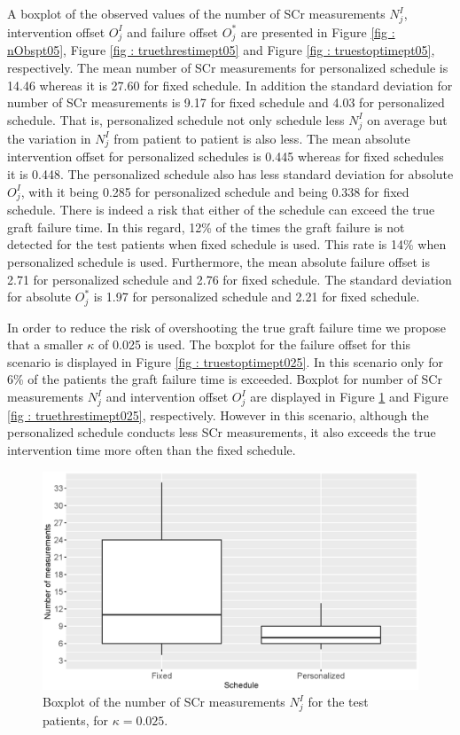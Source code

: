 A boxplot of the observed values of the number of SCr measurements $N^I_j$, intervention offset $O^I_j$ and failure offset $O^*_j$ are presented in Figure \ref{fig : nObspt05}, Figure \ref{fig : truethrestimept05} and Figure \ref{fig : truestoptimept05}, respectively. The mean number of SCr measurements for personalized schedule is 14.46 whereas it is 27.60 for fixed schedule. In addition the standard deviation for number of SCr measurements is 9.17 for fixed schedule and 4.03 for personalized schedule. That is, personalized schedule not only schedule less $N^I_j$ on average but the variation in $N^I_j$ from patient to patient is also less. The mean absolute intervention offset for personalized schedules is 0.445 whereas for fixed schedules it is 0.448. The personalized schedule also has less standard deviation for absolute $O^I_j$, with it being 0.285 for personalized schedule and being 0.338 for fixed schedule. There is indeed a risk that either of the schedule can exceed the true graft failure time. In this regard, 12\% of the times the graft failure is not detected for the test patients when fixed schedule is used. This rate is 14\% when personalized schedule is used. Furthermore, the mean absolute failure offset is 2.71 for personalized schedule and 2.76 for fixed schedule. The standard deviation for absolute $O^*_j$ is 1.97 for personalized schedule and 2.21 for fixed schedule. 

In order to reduce the risk of overshooting the true graft failure time we propose that a smaller $\kappa$ of 0.025 is used. The boxplot for the failure offset for this scenario is displayed in Figure \ref{fig : truestoptimept025}. In this scenario only for 6\% of the patients the graft failure time is exceeded. Boxplot for number of SCr measurements $N^I_j$ and intervention offset $O^I_j$ are displayed in Figure \ref{fig : nObspt025} and Figure \ref{fig : truethrestimept025}, respectively. However in this scenario, although the personalized schedule conducts less SCr measurements, it also exceeds the true intervention time more often than the fixed schedule.

\begin{figure}[!htb]
\centerline{\includegraphics[width=\columnwidth]{images/nObspt025.eps}}
\caption{Boxplot of the number of SCr measurements $N^I_j$ for the test patients, for $\kappa = 0.025$.}
\label{fig : nObspt025}
\end{figure}

